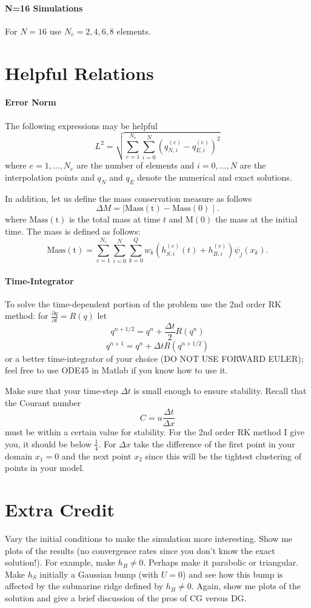 \documentclass[10pt]{article}
\newcommand{\diff}[2] {\frac{\partial #1}{\partial #2}}
\newcommand{\be}{\begin{equation}}
\newcommand{\ee}{\end{equation}}
\begin{document}
\paragraph{N=16 Simulations}
For $N=16$ use $N_e=2,4,6,8$ elements.

\section{Helpful Relations}

\paragraph{Error Norm}
The following expressions may be helpful
\be
L^2 = \sqrt{ \sum_{e=1}^{N_e} \sum_{i=0}^{N}  \left(
      q_{N,i}^{(e)} - q_{E,i}^{(e)} \right)^2}
\ee
where $e=1,...,N_e$ are the number of elements and $i=0,...,N$ are the
interpolation points and $q_{N}$ and $q_{E}$ denote the numerical and exact solutions.

In addition, let us define the mass conservation measure as follows
\[
\Delta M = \mid \mathrm{Mass(t)} - \mathrm{Mass(0)} \mid.
\]
where $\mathrm{Mass(t)}$ is the total mass at time $t$ and
$\mathrm{M(0)}$ the mass at the initial time. The mass is defined as
follows:
\[
\mathrm{Mass(t)}=\sum_{e=1}^{N_e} \sum_{i=0}^{N}  \sum_{k=0}^{Q} w_k \left( h_{S,i}^{(e)}
(t) +
h_{B,i}^{(e)} \right) \psi_j(x_k).
\]

\paragraph{Time-Integrator}
To solve the time-dependent portion of the problem use the 2nd order RK method: for $\diff{q}{t}=R(q)$ let
\[
q^{n+1/2}=q^n + \frac{\Delta t}{2} R(q^n) 
\]
\[
q^{n+1}=q^n + \Delta t R(q^{n+1/2}) 
\]
or a better time-integrator of your choice (DO NOT USE FORWARD EULER);
feel free to use ODE45 in Matlab if you know how to use it.

Make sure that your time-step $\Delta t$ is small enough to ensure stability. Recall that the Courant number
\[
C=u \frac{\Delta t}{\Delta x}
\]
must be within a certain value for stability. For the 2nd order RK method I give you, it should be below $\frac{1}{4}$.
For $\Delta x$ take the difference of the first point in your domain
$x_1=0$ and the next point $x_2$ since this will be the tightest
clustering of points in your model.  

\section{Extra Credit}
Vary the initial conditions to make the simulation more interesting. Show me plots of the results (no convergence rates since you don't know the exact solution!).  For example, make $h_B \ne 0$. Perhaps make it parabolic or triangular. Make $h_S$ initially a Gaussian bump (with $U=0$) and see how this bump is affected by the submarine ridge defined by $h_B \ne 0$. Again, show me plots of the solution and give a brief discussion of the pros of CG versus DG.
\end{document}
